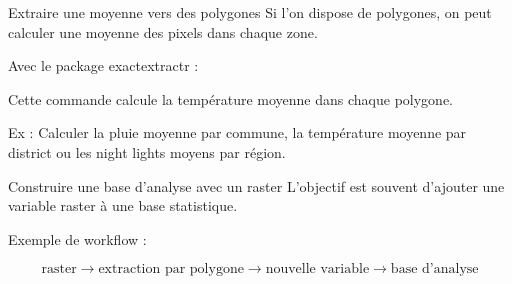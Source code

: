\documentclass[
  10pt,
  ignorenonframetext,
]{beamer}
\newenvironment{Shaded}{\begin{snugshade}}{\end{snugshade}}
\newcommand{\FunctionTok}[1]{\textcolor[rgb]{0.13,0.29,0.53}{\textbf{#1}}}
\newcommand{\NormalTok}[1]{#1}
\newcommand{\OtherTok}[1]{\textcolor[rgb]{0.56,0.35,0.01}{#1}}
\newcommand{\SpecialCharTok}[1]{\textcolor[rgb]{0.81,0.36,0.00}{\textbf{#1}}}
\newcommand{\StringTok}[1]{\textcolor[rgb]{0.31,0.60,0.02}{#1}}
\begin{document}
\begin{frame}[fragile]{Extraire une moyenne vers des polygones}
\label{extraire-une-moyenne-vers-des-polygones}
Si l'on dispose de polygones, on peut calculer une moyenne des pixels
dans chaque zone.

Avec le package exactextractr :

\begin{Shaded}
\end{Shaded}

Cette commande calcule la température moyenne dans chaque polygone.

Ex : Calculer la pluie moyenne par commune, la température moyenne par
district ou les night lights moyens par région.
\end{frame}

\begin{frame}[fragile]{Construire une base d'analyse avec un raster}
\label{construire-une-base-danalyse-avec-un-raster}
L'objectif est souvent d'ajouter une variable raster à une base
statistique.

Exemple de workflow :

\[
\text{raster}
\rightarrow
\text{extraction par polygone}
\rightarrow
\text{nouvelle variable}
\rightarrow
\text{base d’analyse}
\]

\begin{Shaded}
\end{Shaded}
\end{frame}
\end{document}
